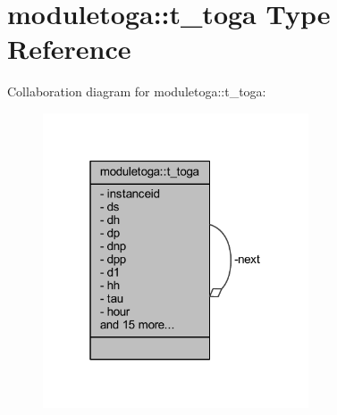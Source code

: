 \hypertarget{structmoduletoga_1_1t__toga}{}\section{moduletoga\+:\+:t\+\_\+toga Type Reference}
\label{structmoduletoga_1_1t__toga}


Collaboration diagram for moduletoga\+:\+:t\+\_\+toga\+:\nopagebreak
\begin{figure}[H]
\begin{center}
\leavevmode
\includegraphics[width=223pt]{structmoduletoga_1_1t__toga__coll__graph}
\end{center}
\end{figure}
